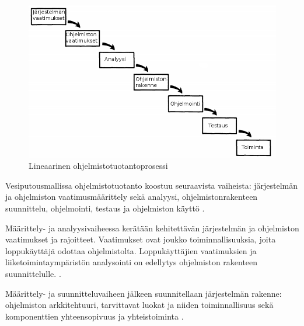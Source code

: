 \documentclass[finnish]{tktltiki2}
\theoremstyle{definition}
\theoremstyle{remark}
\begin{document}
\begin{figure}[h!]
\caption{Lineaarinen ohjelmistotuotantoprosessi}
\centering
\includegraphics[width=\textwidth]{waterfall}
\end{figure}

Vesiputousmallissa ohjelmistotuotanto koostuu seuraavista vaiheista: järjestelmän ja ohjelmiston vaatimusmäärittely sekä analyysi, ohjelmistonrakenteen suunnittelu, ohjelmointi, testaus ja ohjelmiston käyttö \cite{ROY70}.

Määrittely- ja analyysivaiheessa kerätään kehitettävän järjestelmän ja ohjelmiston vaatimukset ja rajoitteet. Vaatimukset ovat joukko toiminnallisuuksia, joita loppukäyttäjä odottaa ohjelmistolta. Loppukäyttäjien vaatimuksien ja liiketoimintaympäristön analysointi on edellytys ohjelmiston rakenteen suunnittelulle. \cite{ROY70}.

Määrittely- ja suunnitteluvaiheen jälkeen suunnitellaan järjestelmän rakenne: ohjelmiston arkkitehtuuri, tarvittavat luokat ja niiden toiminnallisuus sekä komponenttien yhteensopivuus ja yhteistoiminta \cite{ROY70}.
\end{document}
